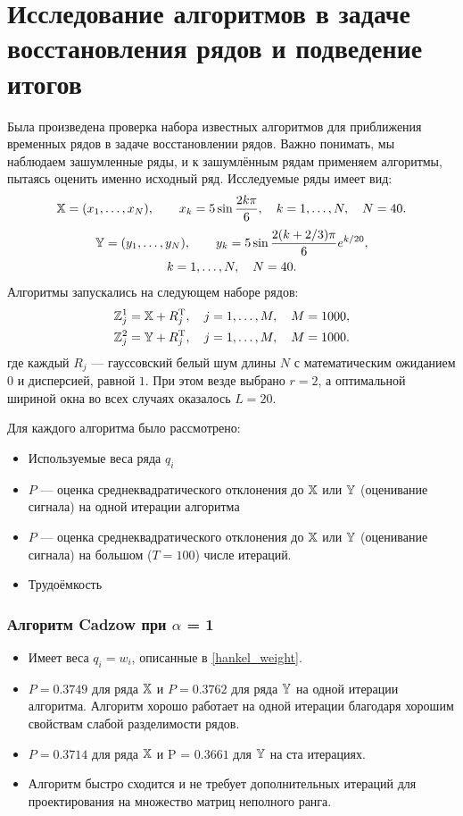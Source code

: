 \documentclass[12pt,a4paper,fleqn,leqno]{article}
\begin{document}
\section{Исследование алгоритмов в задаче восстановления рядов и подведение итогов}
Была произведена проверка набора известных алгоритмов для приближения временных рядов в задаче восстановлении рядов. Важно понимать, мы наблюдаем зашумленные ряды, и к зашумлённым рядам применяем алгоритмы, пытаясь оценить именно исходный ряд.
Исследуемые ряды имеет вид:
\begin{equation*}
\mathbb{X} = (x_1, \ldots, x_N), \qquad x_k = 5\sin{\frac{2 k \pi}{6}}, \quad k = 1, \ldots, N, \quad N = 40.
\end{equation*}
\begin{gather*}
\mathbb{Y} = (y_1, \ldots, y_N), \qquad y_k = 5\sin{\frac{2 (k + 2/3) \pi}{6}} e^{k / 20}, \\ k = 1, \ldots, N, \quad N = 40.
\end{gather*}
Алгоритмы запускались на следующем наборе рядов:
\begin{gather*}
\mathbb{Z}^1_j = \mathbb{X} + R_j^{\mathrm{T}}, \quad j = 1, \ldots, M, \quad M = 1000, \\
\mathbb{Z}^2_j = \mathbb{Y} + R_j^{\mathrm{T}}, \quad j = 1, \ldots, M, \quad M = 1000.
\end{gather*}
где каждый $R_j$ --- гауссовский белый шум длины $N$ с математическим ожиданием $0$ и дисперсией, равной $1$. При этом везде выбрано $r=2$, а оптимальной шириной окна во всех случаях оказалось $L = 20$.

Для каждого алгоритма было рассмотрено:
\begin{itemize}
\item Используемые веса ряда $q_i$
\item $P$ --- оценка среднеквадратического отклонения до $\mathbb{X}$ или $\mathbb{Y}$ (оценивание сигнала) на одной итерации алгоритма
\item $P$ --- оценка среднеквадратического отклонения до $\mathbb{X}$ или $\mathbb{Y}$ (оценивание сигнала) на  большом ($T = 100$) числе итераций.
\item Трудоёмкость
\end{itemize}

\subsubsection{Алгоритм Cadzow при $\alpha$ = 1}
\begin{itemize}
\item Имеет веса $q_i = w_i$, описанные в \eqref{hankel_weight}.
\item $P = 0.3749$ для ряда $\mathbb{X}$ и $P = 0.3762$ для ряда $\mathbb{Y}$ на одной итерации алгоритма. Алгоритм хорошо работает на одной итерации благодаря хорошим свойствам слабой разделимости рядов.
\item $P = 0.3714$ для ряда $\mathbb{X}$ и P = $0.3661$ для $\mathbb{Y}$ на ста итерациях.
\item Алгоритм быстро сходится и не требует дополнительных итераций для проектирования на множество матриц неполного ранга.
\end{itemize}
\end{document}
